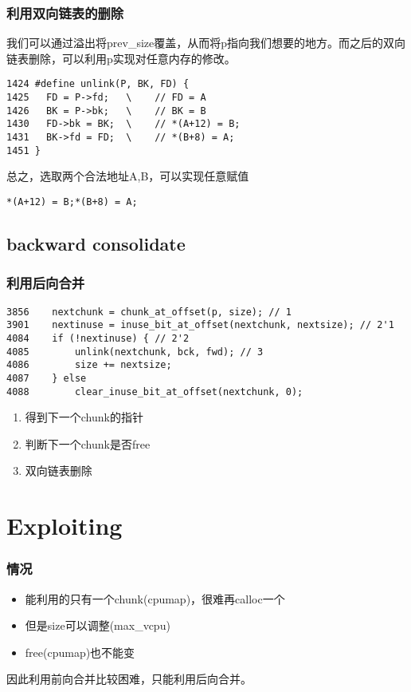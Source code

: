 \documentclass[t]{beamer}
\begin{document}
\begin{frame}[fragile]
\frametitle{\kaishu 利用双向链表的删除}
我们可以通过溢出将prev\_size覆盖，从而将p指向我们想要的地方。而之后的双向链表删除，可以利用p实现对任意内存的修改。
\begin{lstlisting}
1424 #define unlink(P, BK, FD) {
1425   FD = P->fd;   \    // FD = A
1426   BK = P->bk;   \    // BK = B
1430   FD->bk = BK;  \    // *(A+12) = B;
1431   BK->fd = FD;  \    // *(B+8) = A;
1451 }
\end{lstlisting}

总之，选取两个合法地址A,B，可以实现任意赋值

\texttt{*(A+12) = B;*(B+8) = A;}
\end{frame}

\subsection{backward consolidate}
\begin{frame}[fragile]
\frametitle{\kaishu 利用后向合并}

\begin{lstlisting}
3856    nextchunk = chunk_at_offset(p, size); // 1
3901    nextinuse = inuse_bit_at_offset(nextchunk, nextsize); // 2'1
4084    if (!nextinuse) { // 2'2
4085        unlink(nextchunk, bck, fwd); // 3
4086        size += nextsize;
4087    } else
4088        clear_inuse_bit_at_offset(nextchunk, 0);
\end{lstlisting}
\begin{enumerate}
  \item 得到下一个chunk的指针
  \item 判断下一个chunk是否free
  \item 双向链表删除
\end{enumerate}
\end{frame}

\section{Exploiting}
\begin{frame}[fragile]
\frametitle{\kaishu 情况}
\begin{itemize}
  \item 能利用的只有一个chunk(cpumap)，很难再calloc一个
  \item 但是size可以调整(max\_vcpu)
  \item free(cpumap)也不能变
\end{itemize}

因此利用前向合并比较困难，只能利用后向合并。

\end{frame}
\end{document}
